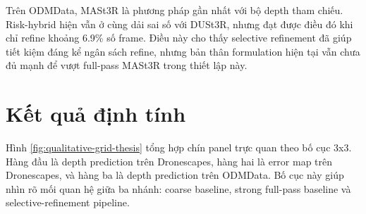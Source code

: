 \documentclass[12pt,a4paper,oneside]{report}
\begin{document}
Trên ODMData, MASt3R là phương pháp gần nhất với bộ depth tham chiếu. Risk-hybrid hiện vẫn ở cùng dải sai số với DUSt3R, nhưng đạt được điều đó khi chỉ refine khoảng 6.9\% số frame. Điều này cho thấy selective refinement đã giúp tiết kiệm đáng kể ngân sách refine, nhưng bản thân formulation hiện tại vẫn chưa đủ mạnh để vượt full-pass MASt3R trong thiết lập này.

\section{Kết quả định tính}

Hình \ref{fig:qualitative-grid-thesis} tổng hợp chín panel trực quan theo bố cục 3x3. Hàng đầu là depth prediction trên Dronescapes, hàng hai là error map trên Dronescapes, và hàng ba là depth prediction trên ODMData. Bố cục này giúp nhìn rõ mối quan hệ giữa ba nhánh: coarse baseline, strong full-pass baseline và selective-refinement pipeline.
\end{document}
